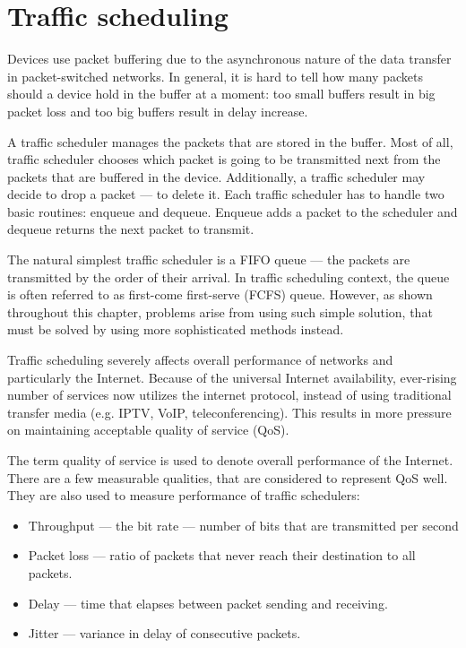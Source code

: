 \chapter{Traffic scheduling}
\label{chap1}

Devices use packet buffering due to the asynchronous nature of the data transfer in packet-switched networks. In general, it is hard to tell how many packets should a device hold in the buffer at a moment: too small buffers result in big packet loss and too big buffers result in delay increase. 

A traffic scheduler manages the packets that are stored in the buffer. Most of all, traffic scheduler chooses which packet is going to be transmitted next from the packets that are buffered in the device. Additionally, a traffic scheduler may decide to drop a packet --- to delete it. Each traffic scheduler has to handle two basic routines: enqueue and dequeue. Enqueue adds a packet to the scheduler and dequeue returns the next packet to transmit.

The natural simplest traffic scheduler is a FIFO queue --- the packets are transmitted by the order of their arrival. In traffic scheduling context, the queue is often referred to as first-come first-serve (FCFS) queue. However, as shown throughout this chapter, problems arise from using such simple solution, that must be solved by using more sophisticated methods instead.

Traffic scheduling severely affects overall performance of networks and particularly the Internet. Because of the universal Internet availability, ever-rising number of services now utilizes the internet protocol, instead of using traditional transfer media (e.g. IPTV, VoIP, teleconferencing). This results in more pressure on maintaining acceptable quality of service (QoS).

The term quality of service is used to denote overall performance of the Internet. There are a few measurable qualities, that are considered to represent QoS well. They are also used to measure performance of traffic schedulers:
\begin{itemize}
	\item Throughput --- the bit rate --- number of bits that are transmitted per second
	\item Packet loss --- ratio of packets that never reach their destination to all packets.
	\item Delay --- time that elapses between packet sending and receiving.
	\item Jitter --- variance in delay of consecutive packets.
\end{itemize}

